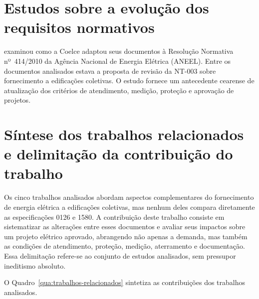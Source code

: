 \section{Estudos sobre a evolução dos requisitos normativos}
\label{sec:trabalhos-evolucao}

 examinou como a Coelce adaptou seus documentos à Resolução Normativa nº~414/2010 da Agência Nacional de Energia Elétrica (ANEEL). Entre os documentos analisados estava a proposta de revisão da NT-003 sobre fornecimento a edificações coletivas. O estudo fornece um antecedente cearense de atualização dos critérios de atendimento, medição, proteção e aprovação de projetos.

\section{Síntese dos trabalhos relacionados e delimitação da contribuição do trabalho}
\label{sec:sintese-trabalhos}

Os cinco trabalhos analisados abordam aspectos complementares do fornecimento de energia elétrica a edificações coletivas, mas nenhum deles compara diretamente as especificações 0126 e 1580. A contribuição deste trabalho consiste em sistematizar as alterações entre esses documentos e avaliar seus impactos sobre um projeto elétrico aprovado, abrangendo não apenas a demanda, mas também as condições de atendimento, proteção, medição, aterramento e documentação. Essa delimitação refere-se ao conjunto de estudos analisados, sem pressupor ineditismo absoluto.

O Quadro~\ref{qua:trabalhos-relacionados} sintetiza as contribuições dos trabalhos analisados.

